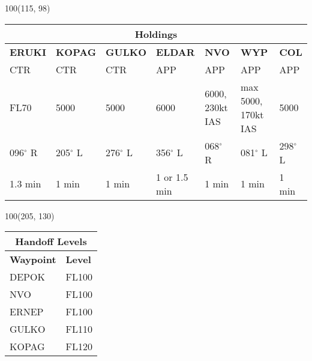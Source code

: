 \documentclass[10pt,landscape,a4paper]{article}
\begin{document}
\begin{textblock}{100}(115, 98)
    \begin{table}
        \begin{tabular}{|l|l|l|l|l|l|l|}
        	\multicolumn{7}{c}{\textbf{Holdings}} \\
            \hline
            \textbf{ERUKI} & \textbf{KOPAG} & \textbf{GULKO} & \textbf{ELDAR} & \textbf{NVO} & \textbf{WYP} & \textbf{COL} \\ 
            \hline
            CTR & CTR & CTR & APP & APP & APP & APP \\ 
            FL70 & 5000 & 5000 & 6000 & 6000, 230kt IAS & max 5000, 170kt IAS & 5000 \\ 
            096$^\circ$ R & 205$^\circ$ L & 276$^\circ$ L & 356$^\circ$ L & 068$^\circ$ R & 081$^\circ$ L & 298$^\circ$ L \\ 
            1.3 min & 1 min & 1 min & 1 or 1.5 min & 1 min & 1 min & 1 min \\ 
            \hline
        \end{tabular}
    \end{table}
\end{textblock}


\begin{textblock}{100}(205, 130)
    \begin{table}
        \begin{tabular}{|l|l|}
        	\multicolumn{2}{c}{\textbf{Handoff Levels}} \\
            \hline
            \textbf{Waypoint} & \textbf{Level}\\ 
            \hline
            DEPOK & FL100 \\ 
            NVO & FL100 \\ 
            ERNEP & FL100 \\ 
            GULKO & FL110 \\ 
            KOPAG & FL120 \\ 
            \hline
        \end{tabular}
    \end{table}
\end{textblock}
\end{document}
